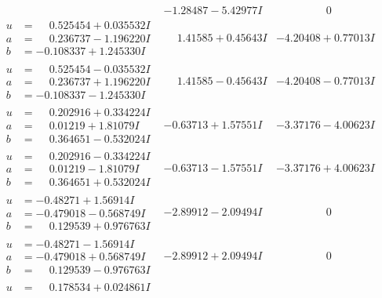 \documentclass[1p]{elsarticle_modified}
\theoremstyle{definition}
\begin{document}
$$\begin{array}{c|c|c}
 & -1.28487 - 5.42977 I & \phantom{-0.000000 } 0 \\ \hline\begin{aligned}
u &= \phantom{-}0.525454 + 0.035532 I \\
a &= \phantom{-}0.236737 - 1.196220 I \\
b &= -0.108337 + 1.245330 I\end{aligned}
 & \phantom{-}1.41585 + 0.45643 I & -4.20408 + 0.77013 I \\ \hline\begin{aligned}
u &= \phantom{-}0.525454 - 0.035532 I \\
a &= \phantom{-}0.236737 + 1.196220 I \\
b &= -0.108337 - 1.245330 I\end{aligned}
 & \phantom{-}1.41585 - 0.45643 I & -4.20408 - 0.77013 I \\ \hline\begin{aligned}
u &= \phantom{-}0.202916 + 0.334224 I \\
a &= \phantom{-}0.01219 + 1.81079 I \\
b &= \phantom{-}0.364651 - 0.532024 I\end{aligned}
 & -0.63713 + 1.57551 I & -3.37176 - 4.00623 I \\ \hline\begin{aligned}
u &= \phantom{-}0.202916 - 0.334224 I \\
a &= \phantom{-}0.01219 - 1.81079 I \\
b &= \phantom{-}0.364651 + 0.532024 I\end{aligned}
 & -0.63713 - 1.57551 I & -3.37176 + 4.00623 I \\ \hline\begin{aligned}
u &= -0.48271 + 1.56914 I \\
a &= -0.479018 - 0.568749 I \\
b &= \phantom{-}0.129539 + 0.976763 I\end{aligned}
 & -2.89912 - 2.09494 I & \phantom{-0.000000 } 0 \\ \hline\begin{aligned}
u &= -0.48271 - 1.56914 I \\
a &= -0.479018 + 0.568749 I \\
b &= \phantom{-}0.129539 - 0.976763 I\end{aligned}
 & -2.89912 + 2.09494 I & \phantom{-0.000000 } 0 \\ \hline\begin{aligned}
u &= \phantom{-}0.178534 + 0.024861 I \\

\end{aligned}
\end{array}$$
\end{document}
